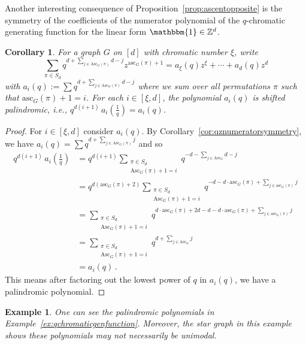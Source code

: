 \documentclass[11pt]{amsart}
\newtheorem{corollary}[theorem]{Corollary}
\newtheorem{exam}{Example}
\newenvironment{example}{\begin{exam}\sf}{\end{exam}}
\newcommand{\asc}{\mathrm{Asc}}
\newcommand{\ascnum}{\mathrm{asc}}
\begin{document}
Another interesting consequence of Proposition~\ref{prop:ascentopposite} is the symmetry of the coefficients of the numerator polynomial of the $q$-chromatic generating function for the linear form $\mathbbm{1} \in \mathbb{Z}^d$.
\begin{corollary}\label{cor:palindromic}
   For a graph $G$ on $[d]$ with chromatic number $\xi$, write
    \[
        \sum_{\pi \in S_d} q^{d+\sum_{j \in \asc_G(\pi)} d-j} z^{\ascnum_G(\pi)+1} = a_\xi (q) z^\xi+ \cdots + a_d(q) z^d 
    \]
    with $a_i(q) := \sum q^{d+\sum_{j \in \asc_G(\pi)} d-j}$ where we sum over all permutations $\pi$ such that $\ascnum_G(\pi)+1 = i$. 
    For each $i \in [\xi,d]$, the polynomial $a_i(q)$ is shifted palindromic, i.e., $q^{d(i+1)} \, a_i( \frac 1 q) =a_i(q)$.
\end{corollary}
\begin{proof}
    For $i \in [\xi,d]$ consider $a_i(q)$. 
    By Corollary~\ref{cor:qznumeratorsymmetry}, we have $a_i(q) = \sum q^{d+\sum_{j \in \asc_G(\pi)} j}$ and so
    \begin{align*} 
        q^{d(i+1)} \, a_i \left( \frac 1 q\right) &= q^{d(i+1)} \sum_{\substack{\pi \in S_d \\ \asc_G(\pi)+1=i}} q^{-d-\sum_{j \in \asc_G} d-j } \\
        &= q^{d(\ascnum_G(\pi)+2)} \sum_{\substack{\pi \in S_d \\ \asc_G(\pi)+1=i}} q^{-d- d \cdot \ascnum_G(\pi) + \sum_{j \in \ascnum_G(\pi)} j }\\
        &=  \sum_{\substack{\pi \in S_d \\ \asc_G(\pi)+1=i}} q^{d\cdot\ascnum_G(\pi)+2d-d- d \cdot \ascnum_G(\pi) + \sum_{j \in \ascnum_G(\pi)} j }\\
        &= \sum_{\substack{\pi \in S_d \\ \asc_G(\pi)+1=i}} q^{d+\sum_{j \in \asc_G} j } \\
        &= a_i(q) \, .
    \end{align*}
    This means after factoring out the lowest power of $q$ in $a_i(q)$, we have a palindromic polynomial.
\end{proof}

\begin{example}
    One can see the palindromic polynomials in Example~\ref{ex:qchromaticgenfunction}.
    Moreover, the star graph in this example shows these polynomials may not necessarily be unimodal. 
\end{example}
\end{document}
